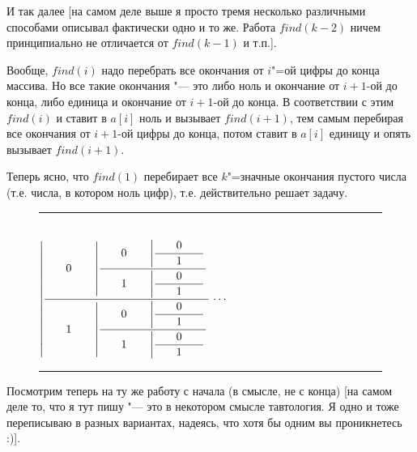 И так далее [на самом деле выше я просто тремя несколько различными способами
описывал фактически одно и то же. Работа $find(k-2)$ ничем принципиально не 
отличается от $find(k-1)$ и т.п.].

Вообще, $find(i)$ надо перебрать все окончания от $i$"=ой цифры до конца массива. Но все 
такие окончания "--- это либо ноль и окончание от $i+1$-ой до конца, либо единица 
и окончание от $i+1$-ой до конца. В соответствии с этим $find(i)$ и ставит в $a[i]$ 
ноль и вызывает $find(i+1)$, тем самым перебирая все окончания от $i+1$-ой цифры до 
конца, потом ставит в $a[i]$ единицу и опять вызывает $find(i+1)$.

Теперь ясно, что $find(1)$ перебирает все $k$"=значные окончания пустого числа (т.е. 
числа, в котором ноль цифр), т.е. действительно решает задачу.

\begin{wrapfigure}{l}{6.5cm}
{\newcommand{\0}{\hbox to 1.5cm{\hfill 0\hfill}}
\newcommand{\1}{\hbox to 1.5cm{\hfill 1\hfill}}
\rule{6cm}{0.5pt}\\
 $
\displaystyle
\left|
\frac{\displaystyle
\0
  \left|
  \frac{\displaystyle
  \0
    \left|
    \frac{\displaystyle
    \0
    }{\displaystyle
    \1
    }
    \right.
  }{\displaystyle
  \1
    \left|
    \frac{\displaystyle
    \0
    }{\displaystyle
    \1
    }
    \right.
  }
  \right.
}{\displaystyle
\1
  \left|
  \frac{\displaystyle
  \0
    \left|
    \frac{\displaystyle
    \0
    }{\displaystyle
    \1
    }
    \right.
  }{\displaystyle
  \1
    \left|
    \frac{\displaystyle
    \0
    }{\displaystyle
    \1
    }
    \right.
  }
  \right.
}
\right.
\cdots
 $\\
\rule{6cm}{0.5pt}
}
\end{wrapfigure}


Посмотрим теперь на ту же работу с начала (в смысле, не с конца) [на самом деле 
то, что я тут пишу "--- это в некотором смысле тавтология. Я одно и тоже 
переписываю в разных вариантах, надеясь, что хотя бы одним вы проникнетесь :)]. 


